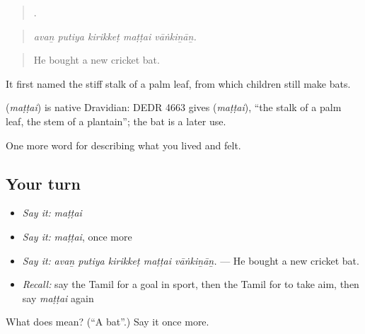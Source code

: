 \begin{quote}
    .
\end{quote}

\begin{quote}
\emph{avaṉ putiya kirikkeṭ maṭṭai vāṅkiṉāṉ.}
\end{quote}

\begin{quote}
He bought a new cricket bat.
\end{quote}

It first named the stiff stalk of a palm leaf, from which children still make bats.

\begin{cousinweb}
\textbf{} (\emph{maṭṭai}) is native Dravidian: DEDR 4663 gives  (\emph{maṭṭai}), \textquotedblleft{}the stalk of a palm leaf, the stem of a plantain\textquotedblright{}; the bat is a later use.
\end{cousinweb}

\begin{grammarlens}[title={What you've built}]
One more word for describing what you lived and felt.
\end{grammarlens}

\subsection*{Your turn}
\begin{itemize}
\raggedright
  \item \emph{Say it:} \emph{maṭṭai}
  \item \emph{Say it:} \emph{maṭṭai}, once more
  \item \emph{Say it:} \emph{avaṉ putiya kirikkeṭ maṭṭai vāṅkiṉāṉ.} — He bought a new cricket bat.
  \item \emph{Recall:} say the Tamil for a goal in sport, then the Tamil for to take aim, then say \emph{maṭṭai} again
\end{itemize}

\begin{tcolorbox}[breakable,colback=teal!4,colframe=teal!35!black,title={Before you move on}]
What does  mean? (\textquotedblleft{}A bat\textquotedblright{}.) Say it once more.
\end{tcolorbox}
